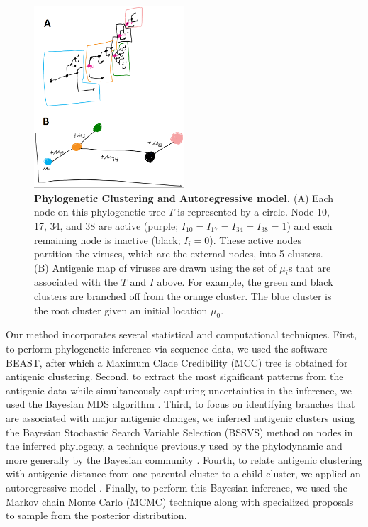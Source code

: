 \documentclass[11pt,oneside,letterpaper]{article}
\begin{document}
\begin{figure}[h]
	\centering		
	\includegraphics[width=0.5\textwidth]{figures/autoregressiveModel}
	\caption{\textbf{Phylogenetic Clustering and Autoregressive model.} 
(A) Each node on this phylogenetic tree $T$ is represented by a circle. 
Node 10, 17, 34, and 38 are active (purple; $I_{10}=I_{17}=I_{34}=I_{38}=1$) and each remaining node is inactive (black; $I_i=0$). 
These active nodes partition the viruses, which are the external nodes, into 5 clusters.
(B) Antigenic map of viruses are drawn using the set of $\mu_i$s that are associated with the $T$ and $I$ above. 
For example, the green and black clusters are branched off from the orange cluster. 
The blue cluster is the root cluster given an initial location $\mu_0$.
	} 
	\label{autoregressiveModel} 
\end{figure}


Our method incorporates several statistical and computational techniques. 
First, to perform phylogenetic inference via sequence data, we used the software BEAST, after which a Maximum Clade Credibility (MCC) tree is obtained for antigenic clustering.
Second, to extract the most significant patterns from the antigenic data while simultaneously capturing uncertainties in the inference, we used the Bayesian MDS algorithm \cite{oh_bayesian_2001}.
Third, to focus on identifying branches that are associated with major antigenic changes, we inferred antigenic clusters using the Bayesian Stochastic Search Variable Selection (BSSVS) method on nodes in the inferred phylogeny, a technique previously used by the phylodynamic \cite{lemey_bayesian_2009, drummond_bayesian_2010} and more generally by the Bayesian community \cite{kuo_variable_1998, hugh_chipman_practical_2001}.
Fourth, to relate antigenic clustering with antigenic distance from one parental cluster to a child cluster, we applied an autoregressive model \cite{drummond_bayesian_2010}.
Finally, to perform this Bayesian inference, we used the Markov chain Monte Carlo (MCMC) technique along with specialized proposals to sample from the posterior distribution. 
\end{document}
